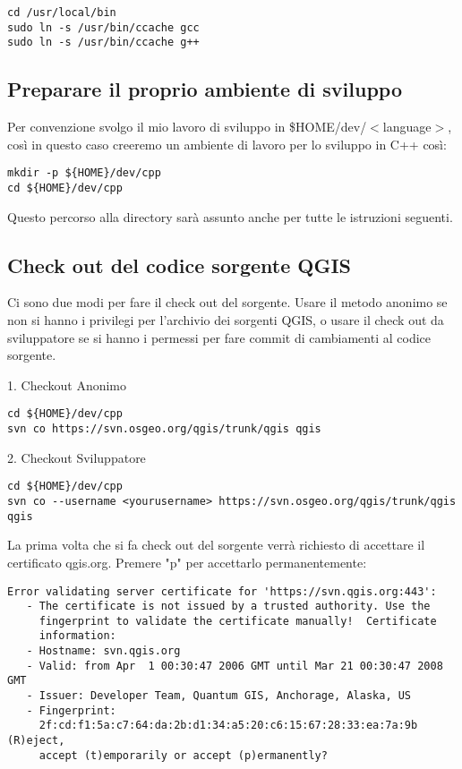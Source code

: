 \begin{verbatim}
cd /usr/local/bin 
sudo ln -s /usr/bin/ccache gcc 
sudo ln -s /usr/bin/ccache g++ 
\end{verbatim}

\subsection{Preparare il proprio ambiente di sviluppo}
Per convenzione svolgo il mio lavoro di sviluppo in \$HOME/dev/$<$language$>$, così in questo caso creeremo un ambiente di lavoro per lo sviluppo in C++ così:

\begin{verbatim}
mkdir -p ${HOME}/dev/cpp 
cd ${HOME}/dev/cpp 
\end{verbatim}

Questo percorso alla directory sarà assunto anche per tutte le istruzioni seguenti.

\subsection{Check out del codice sorgente QGIS}
Ci sono due modi per fare il check out del sorgente. Usare il metodo anonimo se non si hanno i privilegi per l'archivio dei sorgenti QGIS, o usare il check out da sviluppatore se si hanno i permessi per fare commit di cambiamenti al codice sorgente.

1.  Checkout Anonimo

\begin{verbatim}
cd ${HOME}/dev/cpp 
svn co https://svn.osgeo.org/qgis/trunk/qgis qgis
\end{verbatim}

2. Checkout Sviluppatore

\begin{verbatim}
cd ${HOME}/dev/cpp 
svn co --username <yourusername> https://svn.osgeo.org/qgis/trunk/qgis qgis 
\end{verbatim}

La prima volta che si fa check out del sorgente verrà richiesto di accettare il certificato qgis.org. Premere "p" per accettarlo permanentemente:

\begin{verbatim}
Error validating server certificate for 'https://svn.qgis.org:443':
   - The certificate is not issued by a trusted authority. Use the
     fingerprint to validate the certificate manually!  Certificate
     information:
   - Hostname: svn.qgis.org
   - Valid: from Apr  1 00:30:47 2006 GMT until Mar 21 00:30:47 2008 GMT
   - Issuer: Developer Team, Quantum GIS, Anchorage, Alaska, US
   - Fingerprint:
     2f:cd:f1:5a:c7:64:da:2b:d1:34:a5:20:c6:15:67:28:33:ea:7a:9b (R)eject,
     accept (t)emporarily or accept (p)ermanently?  
\end{verbatim}

